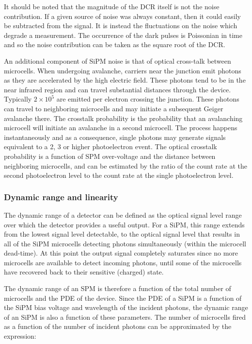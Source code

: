 It should be noted that the magnitude of the DCR itself is not the noise contribution. If a given source of noise was always constant, then it could easily be subtracted from the signal. It is instead the fluctuations on the noise which degrade a measurement. The occurrence of the dark pulses is Poissonian in time and so the noise contribution can be taken as the square root of the DCR.

An additional component of SiPM noise is that of optical cross-talk between microcells. When undergoing avalanche, carriers near the junction emit photons as they are accelerated by the high electric field. These photons tend to be in the near infrared region and can travel substantial distances through the device. Typically $2 \times 10^5$ are emitted per electron crossing the junction. These photons can travel to neighboring microcells and may initiate a subsequent Geiger avalanche there. The crosstalk probability is the probability that an avalanching microcell will initiate an avalanche in a second microcell. The process happens instantaneously and as a consequence, single photons may generate signals equivalent to a 2, 3 or higher photoelectron event. The optical crosstalk probability is a function of SPM over-voltage and the distance between neighboring microcells, and can be estimated by the ratio of the count rate at the second photoelectron level to the count rate at the single photoelectron level. 

\subsubsection*{Dynamic range and linearity}

The dynamic range of a detector can be defined as the optical signal level range over which the detector provides a useful output. For a SiPM, this range extends from the lowest signal level detectable, to the optical signal level that results in all of the SiPM microcells detecting photons simultaneously (within the microcell dead-time). At this point the output signal completely saturates since no more microcells are available to detect incoming photons, until some of the microcells have recovered back to their sensitive (charged) state.

The dynamic range of an SPM is therefore a function of the total number of microcells and the PDE of the device. Since the PDE of a SiPM is a function of the SiPM bias voltage and wavelength of the incident photons, the dynamic range of an SiPM is also a function of these parameters. The number of microcells fired as a function of the number of incident photons can be approximated by the expression:


